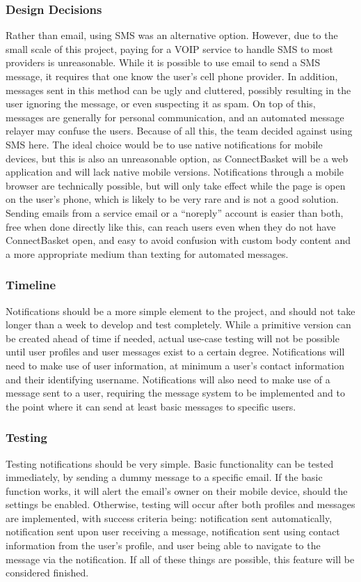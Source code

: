 \documentclass[onecolumn, draftclsnofoot,10pt, compsoc]{IEEEtran}
\begin{document}
\subsubsection{Design Decisions}
Rather than email, using SMS was an alternative option. However, due to the small scale of this project, paying for a VOIP service to handle SMS to most providers is unreasonable. While it is possible to use email to send a SMS message, it requires that one know the user's cell phone provider. In addition, messages sent in this method can be ugly and cluttered, possibly resulting in the user ignoring the message, or even suspecting it as spam. On top of this, messages are generally for personal communication, and an automated message relayer may confuse the users. Because of all this, the team decided against using SMS here. The ideal choice would be to use native notifications for mobile devices, but this is also an unreasonable option, as ConnectBasket will be a web application and will lack native mobile versions. Notifications through a mobile browser are technically possible, but will only take effect while the page is open on the user’s phone, which is likely to be very rare and is not a good solution. Sending emails from a service email or a “noreply” account is easier than both, free when done directly like this, can reach users even when they do not have ConnectBasket open, and easy to avoid confusion with custom body content and a more appropriate medium than texting for automated messages.


\subsubsection{Timeline}
Notifications should be a more simple element to the project, and should not take longer than a week to develop and test completely. While a primitive version can be created ahead of time if needed, actual use-case testing will not be possible until user profiles and user messages exist to a certain degree. Notifications will need to make use of user information, at minimum a user's contact information and their identifying username. Notifications will also need to make use of a message sent to a user, requiring the message system to be implemented and to the point where it can send at least basic messages to specific users.


\subsubsection{Testing}
Testing notifications should be very simple. Basic functionality can be tested immediately, by sending a dummy message to a specific email. If the basic function works, it will alert the email's owner on their mobile device, should the settings be enabled. Otherwise, testing will occur after both profiles and messages are implemented, with success criteria being: notification sent automatically, notification sent upon user receiving a message, notification sent using contact information from the user's profile, and user being able to navigate to the message via the notification. If all of these things are possible, this feature will be considered finished.
\end{document}
